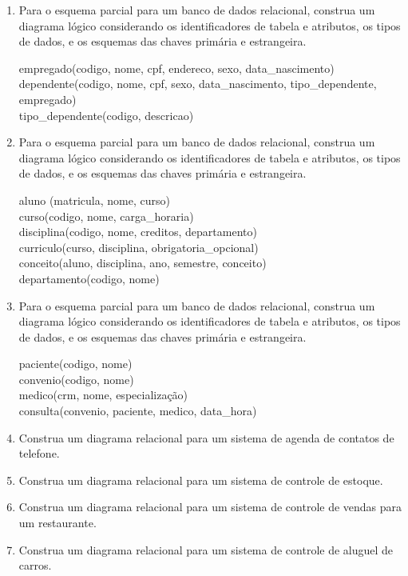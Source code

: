 \documentclass[11pt]{article}
\begin{document}
	\begin{enumerate}
		\item Para o esquema parcial para um banco de dados relacional, construa um diagrama lógico considerando os identificadores de tabela e atributos, os tipos de dados, e os esquemas das chaves primária e estrangeira.
		
		empregado(codigo, nome, cpf, endereco, sexo, data\_nascimento)\\
		dependente(codigo, nome, cpf, sexo, data\_nascimento, tipo\_dependente, empregado)\\
		tipo\_dependente(codigo, descricao)
		
		\item Para o esquema parcial para um banco de dados relacional, construa um diagrama lógico considerando os identificadores de tabela e atributos, os tipos de dados, e os esquemas das chaves primária e estrangeira.
		
		aluno (matricula, nome, curso)\\
		curso(codigo, nome, carga\_horaria)\\ 
		disciplina(codigo, nome, creditos, departamento)\\ 
		curriculo(curso, disciplina, obrigatoria\_opcional)\\ 
		conceito(aluno, disciplina, ano, semestre, conceito)\\ 
		departamento(codigo, nome)
		
		\item Para o esquema parcial para um banco de dados relacional, construa um diagrama lógico considerando os identificadores de tabela e atributos, os tipos de dados, e os esquemas das chaves primária e estrangeira.
				
		paciente(codigo, nome)\\
		convenio(codigo, nome)\\
		medico(crm, nome, especialização)\\
		consulta(convenio, paciente, medico, data\_hora)
		
		\item Construa um diagrama relacional para um sistema de agenda de contatos de telefone.
		
		\item Construa um diagrama relacional para um sistema de controle de estoque.
		
		\item Construa um diagrama relacional para um sistema de controle de vendas para um restaurante.
		
		\item Construa um diagrama relacional para um sistema de controle de aluguel de carros.
	\end{enumerate}
	
\end{document}
